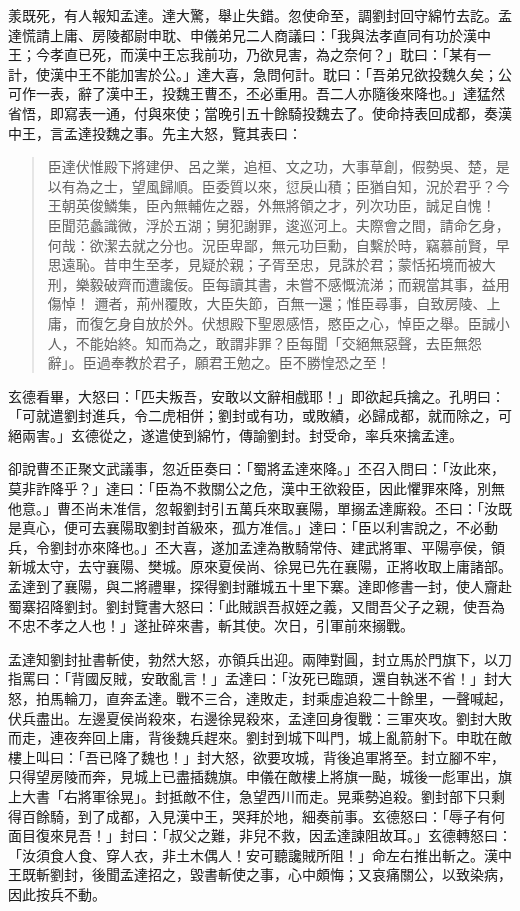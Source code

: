 羕既死，有人報知孟達。達大驚，舉止失錯。忽使命至，調劉封回守綿竹去訖。孟達慌請上庸、房陵都尉申耽、申儀弟兄二人商議曰：「我與法孝直同有功於漢中王；今孝直已死，而漢中王忘我前功，乃欲見害，為之奈何？」耽曰：「某有一計，使漢中王不能加害於公。」達大喜，急問何計。耽曰：「吾弟兄欲投魏久矣；公可作一表，辭了漢中王，投魏王曹丕，丕必重用。吾二人亦隨後來降也。」達猛然省悟，即寫表一通，付與來使；當晚引五十餘騎投魏去了。使命持表回成都，奏漢中王，言孟達投魏之事。先主大怒，覽其表曰：

\begin{quote}
臣達伏惟殿下將建伊、呂之業，追桓、文之功，大事草創，假勢吳、楚，是以有為之士，望風歸順。臣委質以來，愆戾山積；臣猶自知，況於君乎？今王朝英俊鱗集，臣內無輔佐之器，外無將領之才，列次功臣，誠足自愧！
臣聞范蠡識微，浮於五湖；舅犯謝罪，逡巡河上。夫際會之間，請命乞身，何哉：欲潔去就之分也。況臣卑鄙，無元功巨勳，自繫於時，竊慕前賢，早思遠恥。昔申生至孝，見疑於親；子胥至忠，見誅於君；蒙恬拓境而被大刑，樂毅破齊而遭讒佞。臣每讀其書，未嘗不感慨流涕；而親當其事，益用傷悼！
邇者，荊州覆敗，大臣失節，百無一還；惟臣尋事，自致房陵、上庸，而復乞身自放於外。伏想殿下聖恩感悟，愍臣之心，悼臣之舉。臣誠小人，不能始終。知而為之，敢謂非罪？臣每聞「交絕無惡聲，去臣無怨辭」。臣過奉教於君子，願君王勉之。臣不勝惶恐之至！
\end{quote}

玄德看畢，大怒曰：「匹夫叛吾，安敢以文辭相戲耶！」即欲起兵擒之。孔明曰：「可就遣劉封進兵，令二虎相併；劉封或有功，或敗績，必歸成都，就而除之，可絕兩害。」玄德從之，遂遣使到綿竹，傳諭劉封。封受命，率兵來擒孟達。

卻說曹丕正聚文武議事，忽近臣奏曰：「蜀將孟達來降。」丕召入問曰：「汝此來，莫非詐降乎？」達曰：「臣為不救關公之危，漢中王欲殺臣，因此懼罪來降，別無他意。」曹丕尚未准信，忽報劉封引五萬兵來取襄陽，單搦孟達廝殺。丕曰：「汝既是真心，便可去襄陽取劉封首級來，孤方准信。」達曰：「臣以利害說之，不必動兵，令劉封亦來降也。」丕大喜，遂加孟達為散騎常侍、建武將軍、平陽亭侯，領新城太守，去守襄陽、樊城。原來夏侯尚、徐晃已先在襄陽，正將收取上庸諸部。孟達到了襄陽，與二將禮畢，探得劉封離城五十里下寨。達即修書一封，使人齎赴蜀寨招降劉封。劉封覽書大怒曰：「此賊誤吾叔姪之義，又間吾父子之親，使吾為不忠不孝之人也！」遂扯碎來書，斬其使。次日，引軍前來搦戰。

孟達知劉封扯書斬使，勃然大怒，亦領兵出迎。兩陣對圓，封立馬於門旗下，以刀指罵曰：「背國反賊，安敢亂言！」孟達曰：「汝死已臨頭，還自執迷不省！」封大怒，拍馬輪刀，直奔孟達。戰不三合，達敗走，封乘虛追殺二十餘里，一聲喊起，伏兵盡出。左邊夏侯尚殺來，右邊徐晃殺來，孟達回身復戰：三軍夾攻。劉封大敗而走，連夜奔回上庸，背後魏兵趕來。劉封到城下叫門，城上亂箭射下。申耽在敵樓上叫曰：「吾已降了魏也！」封大怒，欲要攻城，背後追軍將至。封立腳不牢，只得望房陵而奔，見城上已盡插魏旗。申儀在敵樓上將旗一颭，城後一彪軍出，旗上大書「右將軍徐晃」。封抵敵不住，急望西川而走。晃乘勢追殺。劉封部下只剩得百餘騎，到了成都，入見漢中王，哭拜於地，細奏前事。玄德怒曰：「辱子有何面目復來見吾！」封曰：「叔父之難，非兒不救，因孟達諫阻故耳。」玄德轉怒曰：「汝須食人食、穿人衣，非土木偶人！安可聽讒賊所阻！」命左右推出斬之。漢中王既斬劉封，後聞孟達招之，毀書斬使之事，心中頗悔；又哀痛關公，以致染病，因此按兵不動。

